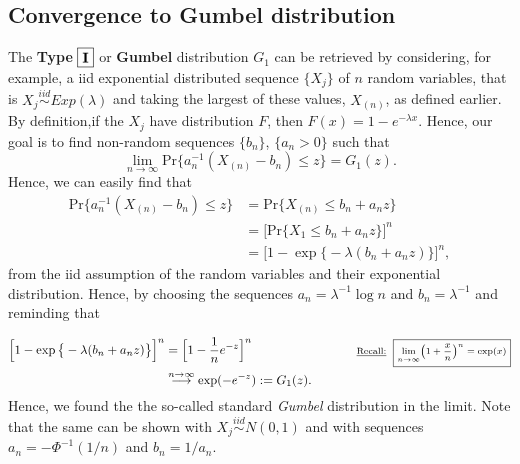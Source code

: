 \documentclass[11pt,a4paper,openany ]{book}
\begin{document}
\subsection*{Convergence to Gumbel distribution}
The \textbf{Type}  $\boxed{\textbf{\text{I}}}$ or \textbf{Gumbel} distribution $G_1$ can be retrieved by considering, for example,  a iid exponential distributed sequence $\{X_j\}$ of $n$ random variables, that is $X_j\stackrel{iid}{\sim}Exp(\lambda)$ and taking the largest of these values, $X_{(n)}$, as defined earlier. By definition,if the $X_j$ have distribution $F$, then $F(x)=1-e^{-\lambda x}$. Hence, our goal is to find non-random sequences $\{b_n\}$, $\{a_n>0\}$ such that 
\begin{equation}
\displaystyle{\lim_{n \to \infty}}\text{Pr}\Big\{ a_n^{-1}(X_{(n)}-b_n)\leq z\Big\}=G_1(z).
\end{equation}
Hence, we can easily find that
\begin{equation*}
\begin{aligned}
\text{Pr}\Big\{ a_n^{-1}(X_{(n)}-b_n)\leq z\Big\}
&=\text{Pr}\big\{X_{(n)}\leq b_n+a_nz\big\} \\ &=\Big[\text{Pr}\{X_1\leq b_n+a_nz\}\Big]^n \\
&=\Big[1-\exp\big\{-\lambda(b_n+a_nz)\big\}\Big]^n,
\end{aligned}
\end{equation*}
from the iid assumption of the random variables and their exponential distribution.
Hence, by choosing  the sequences $a_n=\lambda^{-1}\log n$ and $b_n=\lambda^{-1}$ and reminding that%


\begin{equation*}
\begin{aligned}
\Big[1-\exp\big\{-\lambda(b_n+a_nz)\big\}\Big]^n 
& = \Big[1-\frac{1}{n}e^{-z}\Big]^n \ \ \ \ \ \ \ \ \ \ \ \ \ \ \ \ \ \ \ \ \ \ \ \ \ \scriptsize\text{\underline{Recall:}} \ \ %
\boxed{\scriptsize\displaystyle{\lim_{n \to \infty}}\Big(1+\frac{x}{n}\Big)^n=\exp(x)} \\
& \stackrel{n\to\infty}{\longrightarrow} \exp(-e^{-z}):=G_1(z).
\end{aligned}
\end{equation*}
Hence, we found the the so-called standard \emph{Gumbel} distribution in the limit. 
Note that the same can be shown with $X_j\stackrel{iid}{\sim}N(0,1)$ and with sequences $a_n=-\Phi^{-1}(1/n)$ and $b_n=1/a_n$. 
\end{document}
